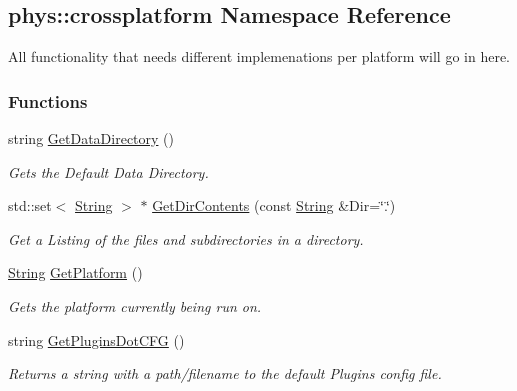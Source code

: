 \hypertarget{namespacephys_1_1crossplatform}{
\subsection{phys::crossplatform Namespace Reference}
\label{namespacephys_1_1crossplatform}
}


All functionality that needs different implemenations per platform will go in here.  


\subsubsection*{Functions}
\begin{DoxyCompactItemize}
\item 
string \hyperlink{namespacephys_1_1crossplatform_ae7b1d4b6dac634392c6224f26ab85001}{GetDataDirectory} ()
\begin{DoxyCompactList}\small\item\em Gets the Default Data Directory. \item\end{DoxyCompactList}\item 
std::set$<$ \hyperlink{namespacephys_aa03900411993de7fbfec4789bc1d392e}{String} $>$ $\ast$ \hyperlink{namespacephys_1_1crossplatform_ae9467e352901b33f7483fe8cc974b578}{GetDirContents} (const \hyperlink{namespacephys_aa03900411993de7fbfec4789bc1d392e}{String} \&Dir=\char`\"{}.\char`\"{})
\begin{DoxyCompactList}\small\item\em Get a Listing of the files and subdirectories in a directory. \item\end{DoxyCompactList}\item 
\hyperlink{namespacephys_aa03900411993de7fbfec4789bc1d392e}{String} \hyperlink{namespacephys_1_1crossplatform_af34fd6dc13360417a87c579744932dce}{GetPlatform} ()
\begin{DoxyCompactList}\small\item\em Gets the platform currently being run on. \item\end{DoxyCompactList}\item 
string \hyperlink{namespacephys_1_1crossplatform_a8f7321f409f1f2a5fa07881ae22fcc2d}{GetPluginsDotCFG} ()
\begin{DoxyCompactList}\small\item\em Returns a string with a path/filename to the default Plugins config file. \item\end{DoxyCompactList}\item 

\end{DoxyCompactItemize}
